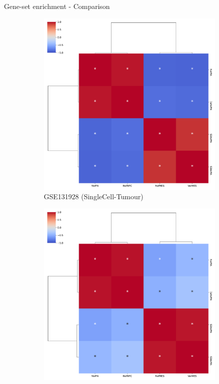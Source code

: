 \documentclass[aspectratio=169,9pt]{beamer}
\begin{document}
    \begin{frame}{Gene-set enrichment - Comparison}
        \begin{adjustwidth}{-5cm}{-5cm}
            \centering
            \begin{figure}\ContinuedFloat
                \centering
                \begin{subfigure}[c]{0.48\textwidth}
                    \centering
                    \includegraphics[width=\textwidth]{AUCell_GSM3828672_corrplot_2D}
                    \caption{GSE131928 (SingleCell-Tumour)}
                \end{subfigure}
                \begin{subfigure}[c]{0.48\textwidth}
                    \centering
                    \includegraphics[width=\textwidth]{AUCell_mgg23_corrplot_2D}

\end{subfigure}
\end{figure}
\end{adjustwidth}
\end{frame}
\end{document}
